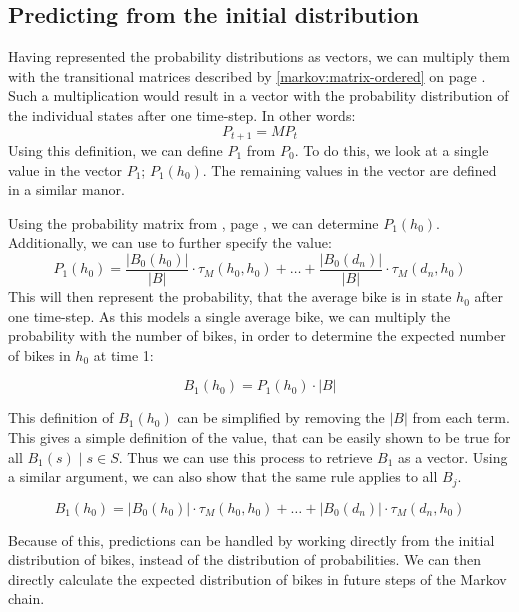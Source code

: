 \subsection{Predicting from the initial distribution}
Having represented the probability distributions as vectors, we can multiply them with the transitional matrices described by \cref{markov:matrix-ordered} on page \pageref{markov:matrix-ordered}.
Such a multiplication would result in a vector with the probability distribution of the individual states after one time-step.
In other words:
\begin{equation}
P_{t+1} = M  P_t
\end{equation}
Using this definition, we can define $P_1$ from $P_0$.
To do this, we look at a single value in the vector $P_1$; $P_1(h_0)$.
The remaining values in the vector are defined in a similar manor.

Using the probability matrix from , page \pageref{markov:matrix-ordered}, we can determine $P_1(h_0)$.
Additionally, we can use  to further specify the value:
$$
P_1(h_0) = 
\frac{\lvert B_0(h_0) \rvert}{\lvert B \rvert}
\cdot \tau_M(h_0, h_0) + \dots +
\frac{\lvert B_0(d_n) \rvert}{\lvert B \rvert}
\cdot \tau_M(d_n, h_0)
$$
This will then represent the probability, that the average bike is in state $h_0$ after one time-step.
As this models a single average bike, we can multiply the probability with the number of bikes, in order to determine the expected number of bikes in $h_0$ at time 1:

$$B_1(h_0) = P_1(h_0) \cdot |B|$$

This definition of $B_1(h_0)$ can be simplified by removing the $|B|$ from each term.
This gives a simple definition of the value, that can be easily shown to be true for all $B_1(s) \mid s \in S$.
Thus we can use this process to retrieve $B_1$ as a vector.
Using a similar argument, we can also show that the same rule applies to all $B_j$.

$$
B_1(h_0) = 
\lvert B_0(h_0) \rvert
\cdot \tau_M(h_0, h_0) + \dots +
\lvert B_0(d_n) \rvert
\cdot \tau_M(d_n, h_0)
$$

Because of this, predictions can be handled by working directly from the initial distribution of bikes, instead of the distribution of probabilities.
We can then directly calculate the expected distribution of bikes in future steps of the Markov chain.

